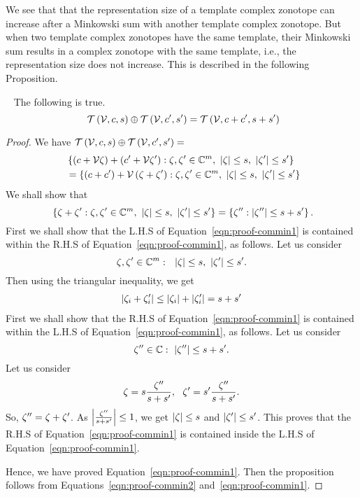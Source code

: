%
We see that that the representation size of a template complex
zonotope can increase after a Minkowski sum with another template
complex zonotope.  But when two template complex
zonotopes have the same template, their Minkowski sum results in a
complex zonotope with the same template, i.e., the representation size
does not increase.  This is described in the following Proposition.
%
\begin{proposition}~\label{prop:commin}
The following is true.
%
\begin{equation}~\label{eqn:common-minkowski}
\mathit{\operatorname{\mathcal{T}}}\left(\mathcal{V},c,s\right)\oplus \mathit{\operatorname{\mathcal{T}}}\left(\mathcal{V},c^\prime,s^\prime\right)=\mathit{\operatorname{\mathcal{T}}}\left(\mathcal{V},c+c^\prime,s+s^\prime\right)
\end{equation}
%
\end{proposition}
%
\begin{proof}
We have $\mathit{\operatorname{\mathcal{T}}}\left(\mathcal{V},c,s\right)\oplus \mathit{\operatorname{\mathcal{T}}}\left(\mathcal{V},c^\prime,s^\prime\right)=$
%
\begin{align}~\label{eqn:proof-commin2}
&
\left\{\left(c+\mathcal{V}\zeta\right)+\left(c^\prime+\mathcal{V}\zeta^\prime\right):\zeta,\zeta^\prime\in\mathbb{C}^m,~\left|\zeta\right|\leq
s,~\left|\zeta^\prime\right|\leq s^\prime\right\}\nonumber\\
& = \left\{\left(c+c^\prime\right)+\mathcal{V}\left(\zeta+\zeta^\prime\right):\zeta,\zeta^\prime\in\mathbb{C}^m,~\left|\zeta\right|\leq
s,~\left|\zeta^\prime\right|\leq s^\prime\right\}
\end{align}
%
We shall show that
\begin{equation}~\label{eqn:proof-commin1}
\left\{\zeta+\zeta^\prime:\zeta,\zeta^\prime\in\mathbb{C}^m,~\left|\zeta\right|\leq
s,~\left|\zeta^\prime\right|\leq s^\prime\right\}=\left\{\zeta^{\prime\prime}:\left|\zeta^{\prime\prime}\right|\leq s+s^\prime \right\}.
\end{equation}
%
First we shall show that the L.H.S of Equation~\ref{eqn:proof-commin1} is
contained within the R.H.S of Equation~\ref{eqn:proof-commin1}, as follows.  Let
us consider
%
\[
\zeta,\zeta^\prime\in\mathbb{C}^m:~~\left|\zeta\right|\leq
s,~\left|\zeta^\prime\right|\leq s^\prime.
\]
%
Then using the triangular inequality, we get
%
\begin{align*}
\left|\zeta_i+\zeta^\prime_i\right|\leq
\left|\zeta_i\right|+\left|\zeta^\prime_i\right|=s+s^\prime
\end{align*}
%
First we shall show that the R.H.S of Equation~\ref{eqn:proof-commin1} is
contained within the L.H.S of Equation~\ref{eqn:proof-commin1}, as follows.  
Let us consider
%
\[
\zeta^{\prime\prime}\in\mathbb{C}:~\left|\zeta^{\prime\prime}\right|\leq s+s^\prime.
\]
%
Let us consider
%
\[
\zeta=s\frac{\zeta^{\prime\prime}}{s+s^\prime},~~\zeta^\prime=s^\prime\frac{\zeta^{\prime\prime}}{s+s^\prime}.
\]
%
So, $\zeta^{\prime\prime}=\zeta+\zeta^\prime$.  As
$\left|\frac{\zeta^{\prime\prime}}{s+s^\prime}\right|\leq 1$, we get
$\left|\zeta\right|\leq s$ and
$\left|\zeta^\prime\right|\leq s^\prime$.  This proves that
the R.H.S of Equation~\ref{eqn:proof-commin1} is contained inside the
L.H.S of Equation~\ref{eqn:proof-commin1}.

Hence, we have proved Equation~\ref{eqn:proof-commin1}.  Then the
proposition follows from
Equations~\ref{eqn:proof-commin2} and~\ref{eqn:proof-commin1}.
\end{proof}
